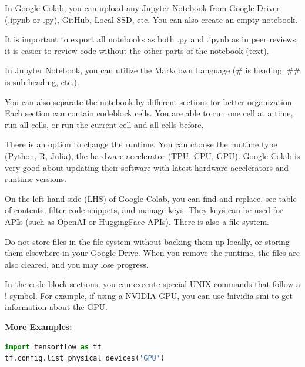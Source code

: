 {In Google Colab, you can upload any Jupyter Notebook from Google Driver (.ipynb or .py), GitHub, Local SSD, etc. You can also create an empty notebook.

\vspace{11pt}
\begin{aside}
    It is important to export all notebooks as both .py and .ipynb as in peer reviews, it is easier to review code without the other parts of the notebook (text).
\end{aside}
\vspace{11pt}

In Jupyter Notebook, you can utilize the Markdown Language (\# is heading, \#\# is sub-heading, etc.).

You can also separate the notebook by different sections for better organization. Each section can contain codeblock cells. You are able to run one cell at a time, run all cells, or run the current cell and all cells before.

There is an option to change the runtime. You can choose the runtime type (Python, R, Julia), the hardware accelerator (TPU, CPU, GPU). Google Colab is very good about updating their software with latest hardware accelerators and runtime versions.

On the left-hand side (LHS) of Google Colab, you can find and replace, see table of contents, filter code snippets, and manage keys. They keys can be used for APIs (such as OpenAI or HuggingFace APIs). There is also a file system.

\vspace{11pt}
\begin{aside}
    Do not store files in the file system without backing them up locally, or storing them elsewhere in your Google Drive. When you remove the runtime, the files are also cleared, and you may lose progress.
\end{aside}
\vspace{11pt}

In the code block sections, you can execute special UNIX commands that follow a ! symbol. For example, if using a NVIDIA GPU, you can use !nividia-smi to get information about the GPU.

\vspace{11pt}
\textbf{More Examples}:
\vspace{11pt}

\vspace{11pt}
\begin{lstlisting}[language=Python, breaklines=true]
import tensorflow as tf
tf.config.list_physical_devices('GPU')    
\end{lstlisting}
\vspace{11pt}

}
